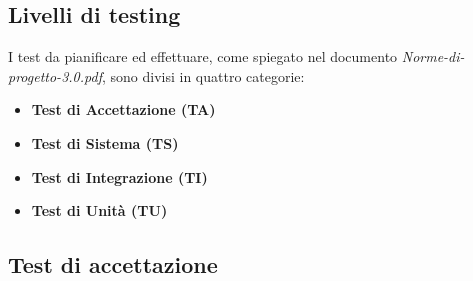 \documentclass[a4paper,11pt]{article}
\begin{document}
\subsection{Livelli di testing}
I test da pianificare ed effettuare, come spiegato nel documento \textit{Norme-di-progetto-3.0.pdf}, sono divisi in quattro categorie:
\begin{itemize}
\item \textbf{Test di Accettazione (TA)}
\item \textbf{Test di Sistema (TS)}
\item \textbf{Test di Integrazione (TI)}
\item \textbf{Test di Unità (TU)}
\end{itemize}
\subsection{Test di accettazione}
	
\end{document}
